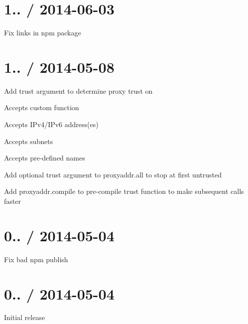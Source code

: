 \section*{1.. / 2014-\/06-\/03 }


\begin{DoxyItemize}
\item Fix links in npm package
\end{DoxyItemize}

\section*{1.. / 2014-\/05-\/08 }


\begin{DoxyItemize}
\item Add {\ttfamily trust} argument to determine proxy trust on
\begin{DoxyItemize}
\item Accepts custom function
\item Accepts I\+Pv4/\+I\+Pv6 address(es)
\item Accepts subnets
\item Accepts pre-\/defined names
\end{DoxyItemize}
\item Add optional {\ttfamily trust} argument to {\ttfamily proxyaddr.\+all} to stop at first untrusted
\item Add {\ttfamily proxyaddr.\+compile} to pre-\/compile {\ttfamily trust} function to make subsequent calls faster
\end{DoxyItemize}

\section*{0.. / 2014-\/05-\/04 }


\begin{DoxyItemize}
\item Fix bad npm publish
\end{DoxyItemize}

\section*{0.. / 2014-\/05-\/04 }


\begin{DoxyItemize}
\item Initial release 
\end{DoxyItemize}